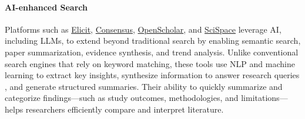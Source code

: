 

\paragraph{AI-enhanced Search}

Platforms such as \href{https://elicit.com}{Elicit}, \href{https://consensus.app}{Consensus}, \href{https://openscholar.allen.ai}{OpenScholar}, and \href{https://typeset.io}{SciSpace} leverage AI, including LLMs, to extend beyond traditional search by enabling semantic search, paper summarization, evidence synthesis, and trend analysis. Unlike conventional search engines that rely on keyword matching, these tools use NLP and machine learning to extract key insights, synthesize information to answer research queries \cite{giglou2024llms4synthesis}, and generate structured summaries. Their ability to quickly summarize and categorize findings—such as study outcomes, methodologies, and limitations—helps researchers efficiently compare and interpret literature.



